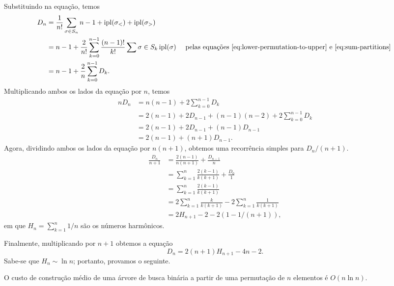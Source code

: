 Substituindo na equação, temos
\begin{align*}
    D_n &= \frac{1}{n!} \sum_{\sigma \in S_n} n-1 + \operatorname{ipl}(\sigma_<) + \operatorname{ipl}(\sigma_>) \\
        &= n-1 + \frac{2}{n!} \sum_{k=0}^{n-1} \frac{(n-1)!}{k!}
            \sum{\sigma \in S_k} \operatorname{ipl}(\sigma) & \text{
            pelas equações~\ref{eq:lower-permutation-to-upper} e \ref{eq:sum-partitions}
        } \\
        &= n-1 + \frac 2 n \sum_{k=0}^{n-1} D_k.
\end{align*}
Multiplicando ambos os lados da equação por $n$, temos
\begin{align*}
    nD_n &= n(n-1) + 2 \sum_{k=0}^{n-1} D_k \\
         &= 2(n-1) + 2 D_{n-1} + (n-1)(n-2) + 2\sum_{k=0}^{n-1} D_k \\
         &= 2(n-1) + 2 D_{n-1} + (n-1)D_{n-1} \\
         &= 2(n-1) + (n+1) D_{n-1}.
\end{align*}
Agora, dividindo ambos os lados da equação por $n(n+1)$,
obtemos uma recorrência simples para $D_n/(n+1)$.
\begin{align*}
    \frac{D_n}{n+1} &= \frac{2(n-1)}{n(n+1)} + \frac{D_{n-1}}{n} \\
        &= \sum_{k=1}^n \frac{2(k-1)}{k(k+1)} + \frac{D_0}{1} \\
        &= \sum_{k=1}^n \frac{2(k-1)}{k(k+1)} \\
        &= 2\sum_{k=1}^n \frac{k}{k(k+1)} - 2 \sum_{k=1}^n \frac{1}{k(k+1)} \\
        &= 2H_{n+1} - 2 - 2(1 - 1/(n+1)),
\end{align*}
em que $H_n = \sum_{k=1}^n 1/n$ são os números harmônicos.

Finalmente, multiplicando por $n+1$ obtemos a equação
\begin{equation}
    D_n = 2(n+1)H_{n+1} - 4n - 2.
    \label{eq:construction-cost}
\end{equation}
Sabe-se que $H_n \sim \ln n$; portanto, provamos o seguinte.

\begin{proposition}
    O custo de construção médio de uma árvore de busca binária
    a partir de uma permutação de $n$ elementos é $O(n \ln n)$.
    \label{thm:construction-cost}
\end{proposition}
